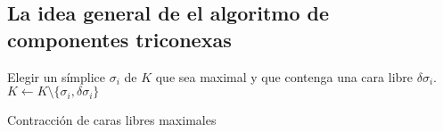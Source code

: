 \subsection{La idea general de el algoritmo de componentes triconexas}

\begin{algorithm}
\begin{algorithmic}[1]
\STATE Elegir un símplice $\sigma_i$ de $K$ que sea maximal y que contenga una cara libre $\delta\sigma_i$.
\RETURN \FALSE
\ELSE
\STATE $K \leftarrow K \setminus \{\sigma_i, \delta\sigma_i\}$
\ENDIF
\ENDWHILE
\RETURN \TRUE
\end{algorithmic}
\caption{Contracción de caras libres maximales}\label{alg:algoritmoRaro}
\end{algorithm}






